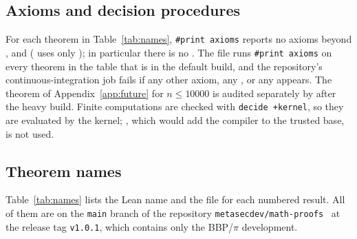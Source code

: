 \documentclass[11pt]{amsart}
\theoremstyle{definition}
\theoremstyle{remark}
\begin{document}
\subsection*{Axioms and decision procedures}
For each theorem in Table~\ref{tab:names}, \mbox{\texttt{\#print axioms}} reports no
axioms beyond ,  and 
( uses only ); in particular there is no
. The file
 runs \mbox{\texttt{\#print axioms}} on every theorem
in the table that is in the default build, and the repository's
continuous-integration job fails if any other axiom, any , or
any  appears. The theorem of Appendix~\ref{app:future}
for $n\le10000$ is audited separately by 
after the heavy build. Finite
computations are checked with \mbox{\texttt{decide +kernel}}, so they are evaluated by
the kernel; , which would add the compiler to the trusted
base, is not used.

\subsection*{Theorem names}
Table~\ref{tab:names} lists the Lean name and the file for each numbered
result. All of them are on the \texttt{main} branch of the repository
\texttt{metasecdev/math-proofs}~\cite{MathProofsSoftware} at the release tag
\texttt{v1.0.1}, which contains only the BBP/$\pi$ development.
\end{document}

